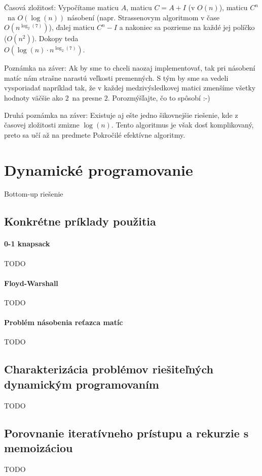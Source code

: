         Časová zložitosť: Vypočítame maticu $A$, maticu $C = A + I$ (v $O(n)$), maticu $C^n$ na $O(\log(n))$ násobení
        (napr. Strassenovym algoritmom v čase $O(n^{\log_2(7)})$), ďalej maticu $C^n - I$ a nakoniec sa pozrieme na
        každé jej políčko ($O(n^2)$). Dokopy teda \\ $O(\log(n) \cdot n^{\log_2(7)})$.
        
        Poznámka na záver: Ak by sme to chceli naozaj implementovať, tak pri násobení matíc nám strašne narastú veľkosti
        premenných. S tým by sme sa vedeli vysporiadať napríklad tak, že v každej medzivýsledkovej matici zmenšíme
        všetky hodnoty väčšie ako $2$ na presne $2$. Porozmýšľajte, čo to spôsobí :-)

        Druhá poznámka na záver: Existuje aj ešte jedno šikovnejšie riešenie, kde z časovej zložitosti zmizne $\log(n)$.
        Tento algoritmus je však dosť komplikovaný, preto sa učí až na predmete Pokročilé efektívne algoritmy.

\section{Dynamické programovanie}
	Bottom-up riešenie
	\subsection{Konkrétne príklady použitia} 
		\paragraph{0-1 knapsack} TODO
		\paragraph{Floyd-Warshall} TODO
		\paragraph{Problém násobenia reťazca matíc} TODO

	\subsection{Charakterizácia problémov riešiteľných dynamickým programovaním} TODO
	
	\subsection{Porovnanie iteratívneho prístupu a rekurzie s memoizáciou} TODO


